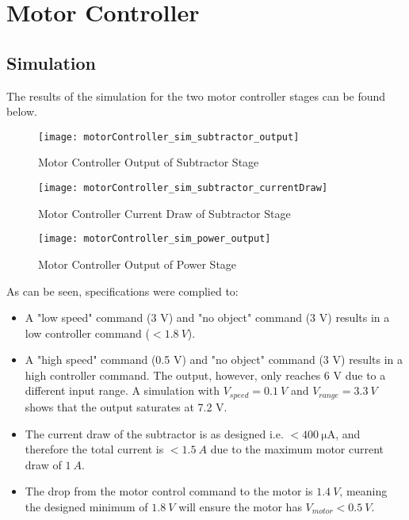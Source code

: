 \graphicspath{{content/3_results/figures}}
\section{Motor Controller}

\subsection{Simulation}

The results of the simulation for the two motor controller stages can be found below.

\begin{figure}[!htb]
  \centering
  \texttt{[image: motorController\_sim\_subtractor\_output]}
  \caption{Motor Controller Output of Subtractor Stage}
  \label{fig:motorController_sim_subtractor_output}
\end{figure}

\begin{figure}[!htb]
  \centering
  \texttt{[image: motorController\_sim\_subtractor\_currentDraw]}
  \caption{Motor Controller Current Draw of Subtractor Stage}
  \label{fig:motorController_sim_subtractor_currentDraw}
\end{figure}

\begin{figure}[!htb]
    \centering
    \texttt{[image: motorController\_sim\_power\_output]}
    \caption{Motor Controller Output of Power Stage}
    \label{fig:motorController_sim_power_output}
  \end{figure}

As can be seen, specifications were complied to:
\begin{itemize}
    \item A "low speed" command (3 V) and "no object" command (3 V) results in a low controller command ($< \SI{1.8}{V}$).
    \item A "high speed" command (0.5 V) and "no object" command (3 V) results in a high controller command. The output, however, only reaches 6 V
          due to a different input range. A simulation with $V_{speed} = \SI{0.1}{V}$ and $V_{range} = \SI{3.3}{V}$ shows that the output saturates at 7.2 V.
    \item The current draw of the subtractor is as designed i.e. $< \SI{400}{\micro\ampere}$, and therefore the total current is $< \SI{1.5}{A}$ due to the
          maximum motor current draw of $\SI{1}{A}$.
    \item The drop from the motor control command to the motor is $\SI{1.4}{V}$, meaning the designed minimum of $\SI{1.8}{V}$ will ensure the motor
          has $V_{motor} < \SI{0.5}{V}$.
\end{itemize}

